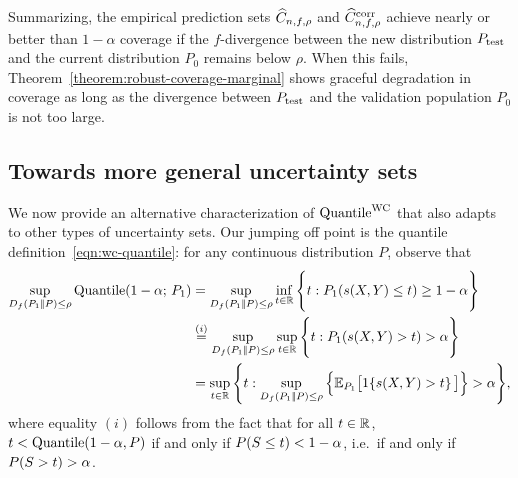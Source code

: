 Summarizing, the empirical prediction sets $\widehat{C}_{n,f,\rho}$ and
$\widehat{C}^{\textup{corr}}_{n,f,\rho}$ achieve nearly or better than
$1-\alpha$ coverage if the $f$-divergence between the new distribution
$P_{\textup{test}}$ and the current distribution $P_0$ remains below $\rho$. When this
fails, Theorem~\ref{theorem:robust-coverage-marginal} shows graceful
degradation in coverage as long as the divergence between $P_{\textup{test}}$ and the
validation population $P_0$ is not too large.

\ifdefined\removenotes
\else
\subsection{Towards more general uncertainty sets}
We now provide an alternative characterization of $\textup{Quantile}^{\textup{WC}}$ that also adapts to other types of uncertainty sets.  
Our jumping off point is the quantile definition~\eqref{eqn:wc-quantile}: for any continuous distribution $P$,  observe that
\begin{align}
    \sup_{D_{f}({P_1} |\!| {P}) \le \rho} \textup{Quantile}(1-\alpha; \, P_1) & = \sup_{D_{f}({P_1} |\!| {P}) \le \rho} \inf_{t \in \mathbb{R}} \Bigg\{ t : P_1(s(X,Y) \leq t) \geq 1-\alpha \Bigg\} \notag \\
    & \overset{(i)}= \sup_{D_{f}({P_1} |\!| {P}) \le \rho} \sup_{t \in \mathbb{R}} \Bigg\{ t : P_1(s(X,Y) > t) > \alpha \Bigg\} \notag \\
    & = \sup_{t \in \mathbb{R}} \Bigg\{ t : \sup_{D_{f}({P_1} |\!| {P}) \le \rho} \Big\{ \mathbb{E}_{P_1} \big[ 1\!\left\{s(X,Y) > t\right\} \big] \Big\} > \alpha \Bigg\}, \label{eqn:wc-quantile-simple}
\end{align}
where equality $(i)$ follows from the fact that for all $t \in \mathbb{R}$,  $t < \textup{Quantile}(1-\alpha, P)$ if and only if $P( S \le t) < 1-\alpha$, i.e.\ if and only if $P( S > t) > \alpha$.
